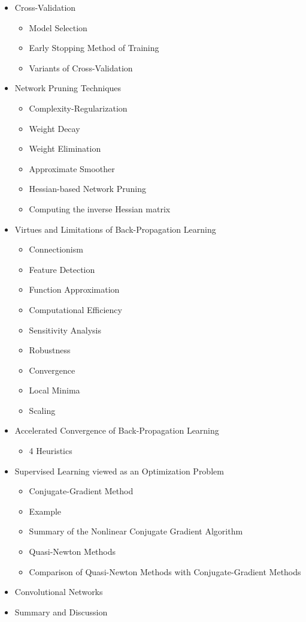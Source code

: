 \documentclass[paper=a4, fontsize=11pt]{scrartcl} %
\numberwithin{equation}{section} %
\numberwithin{figure}{section} %
\numberwithin{table}{section} %
\begin{document}
\begin{itemize}
	\item Cross-Validation
	\begin{itemize}
		\item Model Selection
		\item Early Stopping Method of Training
		\item Variants of Cross-Validation
	\end{itemize}
	
	\item Network Pruning Techniques
	\begin{itemize}
		\item Complexity-Regularization
		\item Weight Decay
		\item Weight Elimination
		\item Approximate Smoother
		\item Hessian-based Network Pruning
		\item Computing the inverse Hessian matrix
	\end{itemize}
	
	\item Virtues and Limitations of Back-Propagation Learning
	\begin{itemize}
		\item Connectionism
		\item Feature Detection
		\item Function Approximation
		\item Computational Efficiency
		\item Sensitivity Analysis
		\item Robustness
		\item Convergence
		\item Local Minima
		\item Scaling
	\end{itemize}
	
	\item Accelerated Convergence of Back-Propagation Learning
	\begin{itemize}
		\item 4 Heuristics
	\end{itemize}
	
	\item Supervised Learning viewed as an Optimization Problem
	\begin{itemize}
		\item Conjugate-Gradient Method
		\item Example
		\item Summary of the Nonlinear Conjugate Gradient Algorithm
		\item Quasi-Newton Methods
		\item Comparison of Quasi-Newton Methods with Conjugate-Gradient Methods
	\end{itemize}
	
	\item Convolutional Networks
	
	
	\item Summary and Discussion
\end{itemize}
\end{document}
